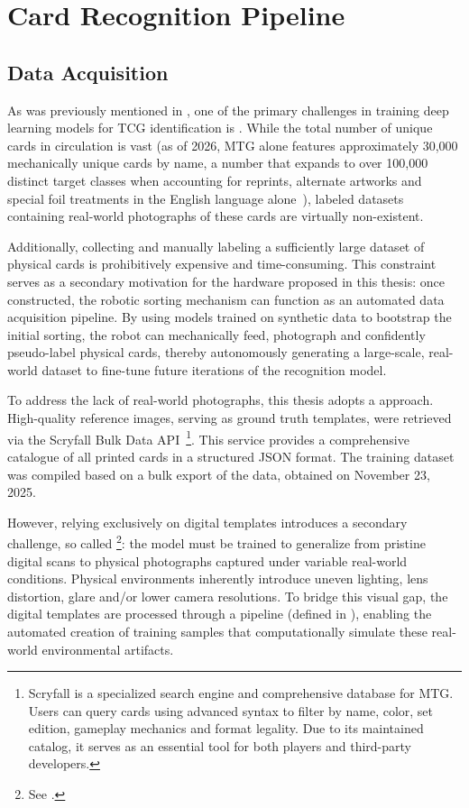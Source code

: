 \chapter{Card Recognition Pipeline}\label{chap:rec}

\section{Data Acquisition}
As was previously mentioned in , one of the primary challenges in training deep learning models for \ac{TCG} identification is . While the total number of unique cards in circulation is vast (as of 2026, \ac{MTG} alone features approximately 30,000 mechanically unique cards by name, a number that expands to over 100,000 distinct target classes when accounting for reprints, alternate artworks and special foil treatments in the English language alone~\cite{scryfall_api}), labeled datasets containing real-world photographs of these cards are virtually non-existent. 

Additionally, collecting and manually labeling a sufficiently large dataset of physical cards is prohibitively expensive and time-consuming. This constraint serves as a secondary motivation for the hardware proposed in this thesis: once constructed, the robotic sorting mechanism can function as an automated data acquisition pipeline. By using models trained on synthetic data to bootstrap the initial sorting, the robot can mechanically feed, photograph and confidently pseudo-label physical cards, thereby autonomously generating a large-scale, real-world dataset to fine-tune future iterations of the recognition model.

To address the lack of real-world photographs, this thesis adopts a  approach. High-quality reference images, serving as ground truth templates, were retrieved via the Scryfall Bulk Data API~\cite{scryfall_api}\footnote{Scryfall is a specialized search engine and comprehensive database for \ac{MTG}. Users can query cards using advanced syntax to filter by name, color, set edition, gameplay mechanics and format legality. Due to its maintained catalog, it serves as an essential tool for both players and third-party developers.}. This service provides a comprehensive catalogue of all printed cards in a structured JSON format. The training dataset was compiled based on a bulk export of the  data, obtained on November 23, 2025.

However, relying exclusively on digital templates introduces a secondary challenge, so called \footnote{See .}: the model must be trained to generalize from pristine digital scans to physical photographs captured under variable real-world conditions. Physical environments inherently introduce uneven lighting, lens distortion, glare and/or lower camera resolutions. To bridge this visual gap, the digital templates are processed through a  pipeline (defined in ), enabling the automated creation of training samples that computationally simulate these real-world environmental artifacts.

